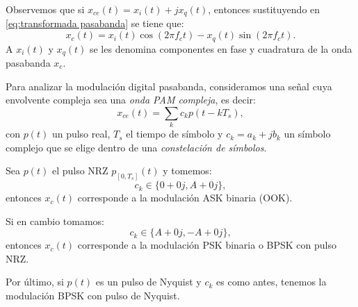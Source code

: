 Observemos que si $x_{ce}(t) = x_i (t) + j x_q(t)$, entonces sustituyendo en \eqref{eq:transformada pasabanda} se tiene que:
\begin{equation*}
    x_c(t) = x_i(t)\cos(2\pi f_c t) - x_q(t)\sin(2\pi f_c t).
\end{equation*}
A $x_i(t)$ y $x_q(t)$ se les denomina componentes en fase y cuadratura de la onda pasabanda $x_c$.

Para analizar la modulación digital pasabanda, consideramos una señal cuya envolvente compleja sea una \emph{onda PAM compleja}, es decir:
\begin{equation}\label{eq:onda pam compleja}
    x_{ce}(t) = \sum_k c_k p(t-kT_s),
\end{equation}
con $p(t)$ un pulso real, $T_s$ el tiempo de símbolo y $c_k = a_k+jb_k$ un símbolo complejo que se elige dentro de una \emph{constelación de símbolos}.

\begin{ejemplo}

    Sea $p(t)$ el pulso NRZ $p_{[0,T_s]}(t)$ y tomemos:
    \begin{equation*}
        c_k \in \{0+0j, A+0j\},
    \end{equation*}
    entonces $x_c(t)$ corresponde a la modulación ASK binaria (OOK).

    Si en cambio tomamos:
    \begin{equation*}
        c_k \in \{A+0j, -A+0j\},
    \end{equation*}
    entonces $x_c(t)$ corresponde a la modulación PSK binaria o BPSK con pulso NRZ.

    Por último, si $p(t)$ es un pulso de Nyquist y $c_k$ es como antes, tenemos la modulación BPSK con pulso de Nyquist.

    \begin{center}
    \hspace{2cm}
    \end{center}
    
\end{ejemplo}

